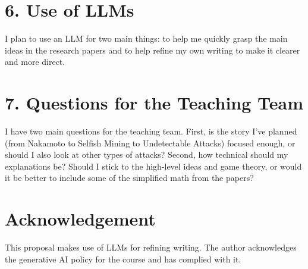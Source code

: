 \documentclass[12pt]{article}
\theoremstyle{definition}
\begin{document}
\section*{6. Use of LLMs}

I plan to use an LLM for two main things: to help me quickly grasp the main ideas in the research papers and to help refine my own writing to make it clearer and more direct.

\section*{7. Questions for the Teaching Team}

I have two main questions for the teaching team. First, is the story I've planned (from Nakamoto to Selfish Mining to Undetectable Attacks) focused enough, or should I also look at other types of attacks? Second, how technical should my explanations be? Should I stick to the high-level ideas and game theory, or would it be better to include some of the simplified math from the papers?

\section*{Acknowledgement}

This proposal makes use of LLMs for refining writing. The author acknowledges the generative AI policy for the course and has complied with it.
\end{document}
